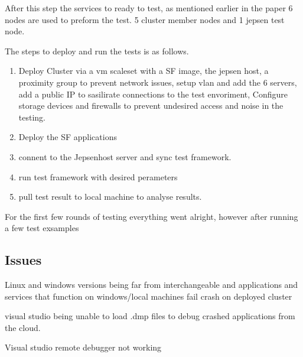 \documentclass[a4paper,10pt,titlepage]{report}
\begin{document}
After this step the services to ready to test, as mentioned earlier in the paper 6 nodes are used to preform the test. 5 cluster member nodes and 1 jepsen test node. 

The steps to deploy and run the tests is as follows.

\begin{enumerate}
\item Deploy Cluster via a vm scaleset with a SF image, the jepsen host, a proximity group to prevent network issues, setup vlan and add the 6 servers, add a public IP to sasilirate connections to the test envoriment, Configure storage devices and firewalls to prevent undesired access and noise in the testing.
\item Deploy the SF applications
\item connent to the Jepsenhost server and sync test framework.
\item run test framework with desired perameters
\item pull test result to local machine to analyse results.
\end{enumerate}

For the first few rounds of testing everything went alright, however after running a few test exsamples 


\subsection{Issues}


Linux and windows versions being far from interchangeable and applications and services that function on windows/local machines fail crash on deployed cluster

visual studio being unable to load .dmp files to debug crashed applications from the cloud.

Visual studio remote debugger not working
%
%
%
%
%
%
%
%
%
\end{document}
